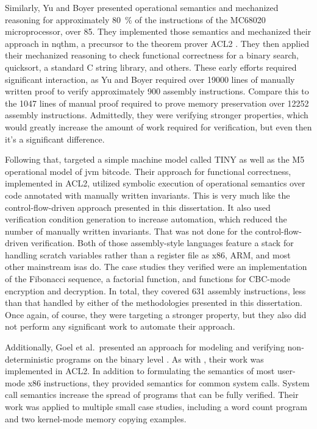 Similarly, Yu and Boyer \autocite{yu1993automated,boyer1996automated}
presented operational semantics and mechanized reasoning
for approximately \SI{80}{\percent} of the instructions of the MC68020 microprocessor,
over 85.
They implemented those semantics and mechanized their approach
in \ac{nqthm}, a precursor to the theorem prover ACL2 \autocite{ACL2}.
They then applied their mechanized reasoning to check functional correctness
for a binary search, quicksort, a standard C string library, and others.
These early efforts required significant interaction,
as Yu and Boyer required over \num{19000}
lines of manually written proof to verify approximately \num{900} assembly instructions.
Compare this to the \num{1047} lines of manual proof
required to prove memory preservation over \num{12252} assembly instructions.
Admittedly, they were verifying stronger properties,
which would greatly increase the amount of work required for verification,
but even then it's a significant difference.

Following that, \textcite{matthews2006verification}
targeted a simple machine model called TINY
as well as the M5 operational model of \ac{jvm} bitcode.
Their approach for functional correctness, implemented in ACL2,
utilized symbolic execution of operational semantics
over code annotated with manually written invariants.
This is very much like the control-flow-driven approach presented in this dissertation.
It also used verification condition generation to increase automation,
which reduced the number of manually written invariants.
That was not done for the control-flow-driven verification.
Both of those assembly-style languages feature a stack
for handling scratch variables rather than a register file
as x86, ARM, and most other mainstream \acp{isa} do.
The case studies they verified were an implementation of the Fibonacci sequence,
a factorial function, and functions for CBC-mode encryption and decryption.
In total, they covered \num{631} assembly instructions,
less than that handled by either of the methodologies presented in this dissertation.
Once again, of course, they were targeting a stronger property,
but they also did not perform any significant work to automate their approach.

Additionally, Goel et al.\ presented an approach for modeling and verifying
non-deterministic programs on the binary level \autocite{goel2014syscalls,goelphd}.
As with \textcite{matthews2006verification}, their work was implemented in ACL2.
In addition to formulating the semantics of most user-mode x86 instructions,
they provided semantics for common system calls.
System call semantics increase the spread of programs that can be fully verified.
Their work was applied to multiple small case studies,
including a word count program and two kernel-mode memory copying examples.
 
